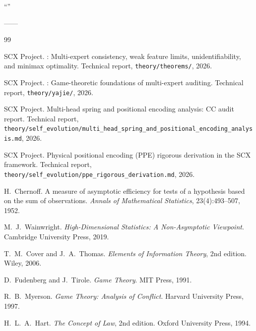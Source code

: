 \documentclass[11pt,a4paper]{article}
\theoremstyle{remark}
\begin{document}
\textbf{}
``''

\textbf{}\textbf{}——


\begin{thebibliography}{99}

SCX Project.
: Multi-expert consistency, weak feature limits,
  unidentifiability, and minimax optimality.
\newblock Technical report, \texttt{theory/theorems/}, 2026.

SCX Project.
: Game-theoretic foundations of multi-expert auditing.
\newblock Technical report, \texttt{theory/yajie/}, 2026.

SCX Project.
\newblock Multi-head spring and positional encoding analysis: {CC} audit report.
\newblock Technical report,
  \texttt{theory/self\_evolution/multi\_head\_spring\_and\_positional\_encoding\_analysis.md},
  2026.

SCX Project.
\newblock Physical positional encoding ({PPE}) rigorous derivation in the {SCX}
  framework.
\newblock Technical report,
  \texttt{theory/self\_evolution/ppe\_rigorous\_derivation.md}, 2026.

H.~Chernoff.
\newblock A measure of asymptotic efficiency for tests of a hypothesis based on
  the sum of observations.
\newblock \emph{Annals of Mathematical Statistics}, 23(4):493--507, 1952.

M.~J.~Wainwright.
\newblock \emph{High-Dimensional Statistics: A Non-Asymptotic Viewpoint}.
\newblock Cambridge University Press, 2019.

T.~M.~Cover and J.~A.~Thomas.
\newblock \emph{Elements of Information Theory}, 2nd edition.
\newblock Wiley, 2006.

D.~Fudenberg and J.~Tirole.
\newblock \emph{Game Theory}.
\newblock MIT Press, 1991.

R.~B.~Myerson.
\newblock \emph{Game Theory: Analysis of Conflict}.
\newblock Harvard University Press, 1997.

H.~L.~A.~Hart.
\newblock \emph{The Concept of Law}, 2nd edition.
\newblock Oxford University Press, 1994.


\end{thebibliography}
\end{document}
